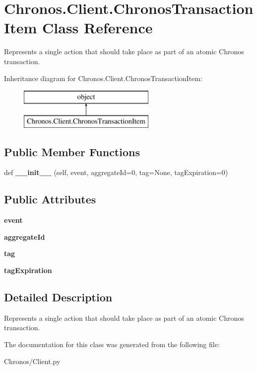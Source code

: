 \hypertarget{classChronos_1_1Client_1_1ChronosTransactionItem}{}\section{Chronos.\+Client.\+Chronos\+Transaction\+Item Class Reference}
\label{classChronos_1_1Client_1_1ChronosTransactionItem}


Represents a single action that should take place as part of an atomic Chronos transaction.  


Inheritance diagram for Chronos.\+Client.\+Chronos\+Transaction\+Item\+:\begin{figure}[H]
\begin{center}
\leavevmode
\includegraphics[height=2.000000cm]{classChronos_1_1Client_1_1ChronosTransactionItem}
\end{center}
\end{figure}
\subsection*{Public Member Functions}
\begin{DoxyCompactItemize}
\item 
def {\bfseries \+\_\+\+\_\+init\+\_\+\+\_\+} (self, event, aggregate\+Id=0, tag=None, tag\+Expiration=0)
\end{DoxyCompactItemize}
\subsection*{Public Attributes}
\begin{DoxyCompactItemize}
\item 
{\bfseries event}
\item 
{\bfseries aggregate\+Id}
\item 
{\bfseries tag}
\item 
{\bfseries tag\+Expiration}
\end{DoxyCompactItemize}


\subsection{Detailed Description}
Represents a single action that should take place as part of an atomic Chronos transaction. 

The documentation for this class was generated from the following file\+:\begin{DoxyCompactItemize}
\item 
Chronos/Client.\+py\end{DoxyCompactItemize}
